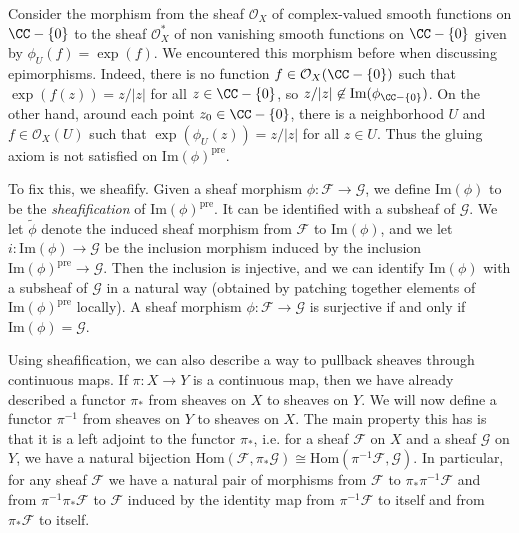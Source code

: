 \begin{example}
    Consider the morphism from the sheaf $\mathcal{O}_X$ of complex-valued smooth functions on $\CC - \{ 0 \}$ to the sheaf $\mathcal{O}_X^*$ of non vanishing smooth functions on $\CC - \{ 0 \}$ given by $\phi_U(f) = \exp(f)$. We encountered this morphism before when discussing epimorphisms. Indeed, there is no function $f \in \mathcal{O}_X(\CC - \{ 0 \})$ such that $\exp(f(z)) = z/|z|$ for all $z \in \CC - \{ 0 \}$, so $z/|z| \not \in \text{Im}(\phi_{\CC - \{ 0 \}})$. On the other hand, around each point $z_0 \in \CC - \{ 0 \}$, there is a neighborhood $U$ and $f \in \mathcal{O}_X(U)$ such that $\exp(\phi_U(z)) = z/|z|$ for all $z \in U$. Thus the gluing axiom is not satisfied on $\text{Im}(\phi)^{\text{pre}}$.
\end{example}

To fix this, we sheafify. Given a sheaf morphism $\phi: \mathcal{F} \to \mathcal{G}$, we define $\text{Im}(\phi)$ to be the \emph{sheafification} of $\text{Im}(\phi)^{\text{pre}}$. It can be identified with a subsheaf of $\mathcal{G}$. We let $\tilde{\phi}$ denote the induced sheaf morphism from $\mathcal{F}$ to $\text{Im}(\phi)$, and we let $i: \text{Im}(\phi) \to \mathcal{G}$ be the inclusion morphism induced by the inclusion $\text{Im}(\phi)^{\text{pre}} \to \mathcal{G}$. Then the inclusion is injective, and we can identify $\text{Im}(\phi)$ with a subsheaf of $\mathcal{G}$ in a natural way (obtained by patching together elements of $\text{Im}(\phi)^{\text{pre}}$ locally). A sheaf morphism $\phi: \mathcal{F} \to \mathcal{G}$ is surjective if and only if $\text{Im}(\phi) = \mathcal{G}$.

Using sheafification, we can also describe a way to pullback sheaves through continuous maps. If $\pi: X \to Y$ is a continuous map, then we have already described a functor $\pi_*$ from sheaves on $X$ to sheaves on $Y$. We will now define a functor $\pi^{-1}$ from sheaves on $Y$ to sheaves on $X$. The main property this has is that it is a left adjoint to the functor $\pi_*$, i.e. for a sheaf $\mathcal{F}$ on $X$ and a sheaf $\mathcal{G}$ on $Y$, we have a natural bijection $\text{Hom}(\mathcal{F},\pi_* \mathcal{G}) \cong \text{Hom}(\pi^{-1} \mathcal{F},\mathcal{G})$. In particular, for any sheaf $\mathcal{F}$ we have a natural pair of morphisms from $\mathcal{F}$ to $\pi_* \pi^{-1} \mathcal{F}$ and from $\pi^{-1} \pi_* \mathcal{F}$ to $\mathcal{F}$ induced by the identity map from $\pi^{-1} \mathcal{F}$ to itself and from $\pi_* \mathcal{F}$ to itself.

